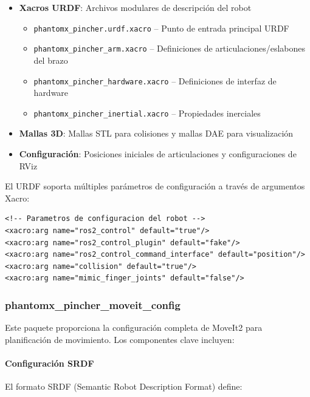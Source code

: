 \begin{itemize}
    \item \textbf{Xacros URDF}: Archivos modulares de descripción del robot
    \begin{itemize}
        \item \texttt{phantomx\_pincher.urdf.xacro} -- Punto de entrada principal URDF
        \item \texttt{phantomx\_pincher\_arm.xacro} -- Definiciones de articulaciones/eslabones del brazo
        \item \texttt{phantomx\_pincher\_hardware.xacro} -- Definiciones de interfaz de hardware
        \item \texttt{phantomx\_pincher\_inertial.xacro} -- Propiedades inerciales
    \end{itemize}
    \item \textbf{Mallas 3D}: Mallas STL para colisiones y mallas DAE para visualización
    \item \textbf{Configuración}: Posiciones iniciales de articulaciones y configuraciones de RViz
\end{itemize}

El URDF soporta múltiples parámetros de configuración a través de argumentos Xacro:

\begin{verbatim}
<!-- Parametros de configuracion del robot -->
<xacro:arg name="ros2_control" default="true"/>
<xacro:arg name="ros2_control_plugin" default="fake"/>
<xacro:arg name="ros2_control_command_interface" default="position"/>
<xacro:arg name="collision" default="true"/>
<xacro:arg name="mimic_finger_joints" default="false"/>
\end{verbatim}

\subsubsection{phantomx\_pincher\_moveit\_config}

Este paquete proporciona la configuración completa de MoveIt2 para planificación de movimiento. Los componentes clave incluyen:

\paragraph{Configuración SRDF}

El formato SRDF (Semantic Robot Description Format) define:

